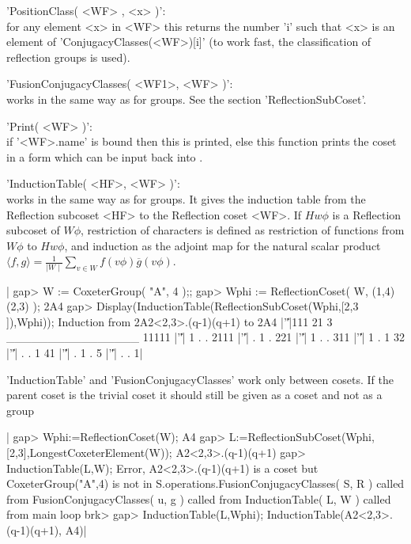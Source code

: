 'PositionClass( <WF> , <x> )':\\ for any element <x> in <WF> this returns
     the  number   'i'   such      that  <x>    is  an     element     of
     'ConjugacyClasses(<WF>)[i]'  (to  work  fast,  the classification of
     reflection groups is used).

'FusionConjugacyClasses( <WF1>, <WF>  )':\\ works in the  same way as for
     groups. See the section 'ReflectionSubCoset'.

'Print( <WF> )':\\ if  '<WF>.name' is bound  then  this is printed,  else
     this function prints  the coset  in a form  which can  be input back
     into \GAP.

'InductionTable( <HF>, <WF> )':\\
     works in the same way as for groups. It gives the induction table from
     the  Reflection  subcoset  <HF>  to  the  Reflection coset <WF>. If $H
     w\phi$ is a Reflection subcoset of $W \phi$, restriction of characters
     is defined as restriction of functions from $W \phi$ to $H w\phi$, and
     induction  as the adjoint map for  the natural scalar product $\langle
     f,  g\rangle =\frac1{\mid  W\mid}\sum_{v\in W}  f(v \phi)\overline g(v
     \phi)$.

|    gap> W := CoxeterGroup( "A", 4 );;
    gap> Wphi := ReflectionCoset( W, (1,4)(2,3) );
    2A4
    gap> Display(InductionTable(ReflectionSubCoset(Wphi,[2,3 ]),Wphi));
    Induction from 2A2<2,3>.(q-1)(q+1) to 2A4
          |'\|'|111 21 3
    ________________
    11111 |'\|'|  1  . .
    2111  |'\|'|  .  1 .
    221   |'\|'|  1  . .
    311   |'\|'|  1  . 1
    32    |'\|'|  .  . 1
    41    |'\|'|  .  1 .
    5     |'\|'|  .  . 1|

    'InductionTable' and 'FusionConjugacyClasses' work only between cosets.
    If the parent coset is the trivial coset it should still be given as
    a coset and not as a group\:

|    gap> Wphi:=ReflectionCoset(W);
    A4
    gap> L:=ReflectionSubCoset(Wphi,[2,3],LongestCoxeterElement(W));
    A2<2,3>.(q-1)(q+1)
    gap> InductionTable(L,W);
    Error, A2<2,3>.(q-1)(q+1) is a coset but CoxeterGroup("A",4) is not in
    S.operations.FusionConjugacyClasses( S, R ) called from
    FusionConjugacyClasses( u, g ) called from
    InductionTable( L, W ) called from
    main loop
    brk>
    gap> InductionTable(L,Wphi);
    InductionTable(A2<2,3>.(q-1)(q+1), A4)|

